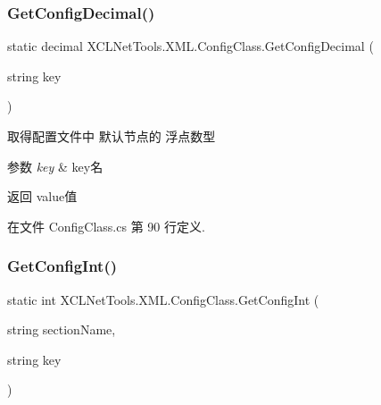 \subsubsection{\texorpdfstring{Get\+Config\+Decimal()}{GetConfigDecimal()}\hspace{0.1cm}{\footnotesize\ttfamily [2/2]}}
{\footnotesize\ttfamily static decimal X\+C\+L\+Net\+Tools.\+X\+M\+L.\+Config\+Class.\+Get\+Config\+Decimal (\begin{DoxyParamCaption}\item[{string}]{key }\end{DoxyParamCaption})\hspace{0.3cm}{\ttfamily [static]}}



取得配置文件中 默认节点的 浮点数型 


\begin{DoxyParams}{参数}
{\em key} & key名\\
\hline
\end{DoxyParams}
\begin{DoxyReturn}{返回}
value值
\end{DoxyReturn}


在文件 Config\+Class.\+cs 第 90 行定义.

\mbox{\label{class_x_c_l_net_tools_1_1_x_m_l_1_1_config_class_ad425ce0eba3934ccc1d52ea684d2e0b8}} 
\subsubsection{\texorpdfstring{Get\+Config\+Int()}{GetConfigInt()}\hspace{0.1cm}{\footnotesize\ttfamily [1/2]}}
{\footnotesize\ttfamily static int X\+C\+L\+Net\+Tools.\+X\+M\+L.\+Config\+Class.\+Get\+Config\+Int (\begin{DoxyParamCaption}\item[{string}]{section\+Name,  }\item[{string}]{key }\end{DoxyParamCaption})\hspace{0.3cm}{\ttfamily [static]}}



